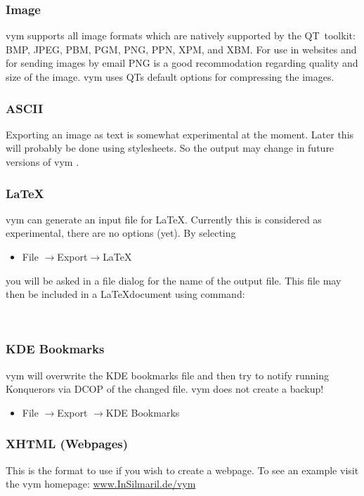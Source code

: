 \documentclass[12pt,a4paper]{article}
\newcommand{\vym}{{\sc vym }}
\newcommand{\ra}{$\longrightarrow$}
\begin{document}
\subsubsection*{Image}
\vym supports all image formats which are natively supported by the
QT~toolkit:
BMP, JPEG, PBM, PGM, PNG, PPN, XPM, and XBM.
For use in websites and for sending images by email PNG is a good
recommodation regarding quality and size of the image. \vym uses QTs
default options for compressing the images.

\subsubsection*{ASCII}
Exporting an image as text is somewhat experimental at the moment. Later
this will probably be done using stylesheets. So the output may change in
future versions of \vym.

\subsubsection*{\LaTeX}
\vym can generate an input file for \LaTeX. Currently this is considered
as experimental, there are no options (yet). 
By selecting
\begin{itemize}
	\item File  \ra Export\ra \LaTeX 
\end{itemize}
you will be asked in a file dialog for the name of the output file. This
file may then be included in a \LaTeX document using command: 
\begin{verbatim}
	
\end{verbatim}

\subsubsection*{KDE Bookmarks}
\vym will overwrite the KDE bookmarks file and then try to notify
running Konquerors via DCOP of the changed file. \vym does not create a
backup!
\begin{itemize}
	\item File \ra Export \ra KDE Bookmarks
\end{itemize}


\subsubsection*{XHTML (Webpages)}

This is the format to use if you wish to create a webpage. To see an example
visit the \vym homepage: 
\href{http://www.InSilmaril.de/vym}{www.InSilmaril.de/vym}
\end{document}
